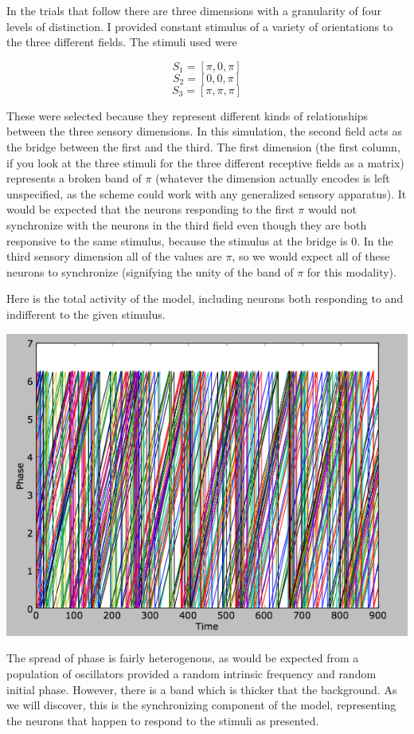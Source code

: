 \documentclass[12pt]{article}
\begin{document}
In the trials that follow there are three dimensions with a granularity of four levels of distinction.  I provided constant stimulus of a variety of orientations to the three different fields.  The stimuli used were

$$ S_1=[\pi,0,\pi] $$
$$ S_2=[0,0,\pi] $$
$$ S_3=[\pi,\pi,\pi] $$

These were selected because they represent different kinds of relationships between the three sensory dimensions.  In this simulation, the second field acts as the bridge between the first and the third.  The first dimension (the first column, if you look at the three stimuli for the three different receptive fields as a matrix) represents a broken band of $\pi$ (whatever the dimension actually encodes is left unspecified, as the scheme could work with any generalized sensory apparatus).  It would be expected that the neurons responding to the first $\pi$ would not synchronize with the neurons in the third field even though they are both responsive to the same stimulus, because the stimulus at the bridge is $0$.  In the third sensory dimension all of the values are $\pi$, so we would expect all of these neurons to synchronize (signifying the unity of the band of $\pi$ for this modality).  

Here is the total activity of the model, including neurons both responding to and indifferent to the given stimulus.  

\vspace{15pt}
\includegraphics[scale=0.6]{totalactivity.png}
\vspace{15pt}

The spread of phase is fairly heterogenous, as would be expected from a population of oscillators provided a random intrinsic frequency and random initial phase.  However, there is a band which is thicker that the background.  As we will discover, this is the synchronizing component of the model, representing the neurons that happen to respond to the stimuli as presented.  
\end{document}
